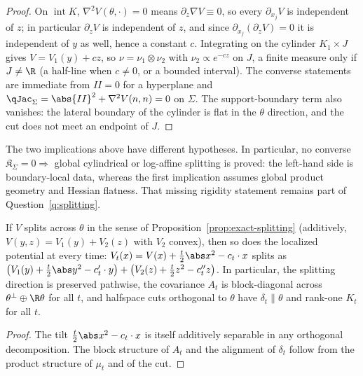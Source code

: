 \documentclass[../../main.tex]{subfiles}
\begin{document}
\begin{proof}
On $\operatorname{int}K$, $\nabla^2V(\theta,\cdot)=0$ means $\partial_z\nabla V\equiv0$, so every
$\partial_{x_j}V$ is independent of $z$; in particular $\partial_zV$ is independent of $z$, and
since $\partial_{x_j}(\partial_zV)=0$ it is independent of $y$ as well, hence a constant $c$.
Integrating on the cylinder $K_1\times J$ gives $V=V_1(y)+cz$, so $\nu=\nu_1\otimes\nu_2$ with
$\nu_2\propto e^{-cz}$ on $J$, a finite measure only if $J\ne\R$ (a half-line when $c\ne0$, or a
bounded interval). The converse statements are immediate from $II=0$ for a hyperplane and
$\qJac_\Sigma=\abs{II}^2+\nabla^2V(n,n)=0$ on $\Sigma$. The support-boundary term also vanishes:
the lateral boundary of the cylinder is flat in the $\theta$ direction, and the cut does not
meet an endpoint of $J$.
\end{proof}

The two implications above have different hypotheses. In particular, no converse
$\mathfrak K_\Sigma=0\Rightarrow$ global cylindrical or log-affine splitting is proved: the
left-hand side is boundary-local data, whereas the first implication assumes global product
geometry and Hessian flatness. That missing rigidity statement remains part of
Question~\ref{q:splitting}.

\begin{proposition}
\label{prop:persistent-splitting}
If $V$ splits across $\theta$ in the sense of
Proposition~\textup{\ref{prop:exact-splitting}} (additively, $V(y,z)=V_1(y)+V_2(z)$ with
$V_2$ convex), then so does the localized potential at every time:
$V_t(x)=V(x)+\tfrac t2\abs x^2-c_t\cdot x$ splits as
$\bigl(V_1(y)+\tfrac t2\abs y^2-c_t'\cdot y\bigr)+\bigl(V_2(z)+\tfrac t2z^2-c_t''z\bigr)$.
In particular, the splitting direction is preserved pathwise, the covariance $A_t$ is
block-diagonal across $\theta^\perp\oplus\R\theta$ for all $t$, and halfspace cuts orthogonal
to $\theta$ have $\delta_t\parallel\theta$ and rank-one $K_t$ for all $t$.
\end{proposition}

\begin{proof}
The tilt $\tfrac t2\abs x^2-c_t\cdot x$ is itself additively separable in any orthogonal
decomposition. The block structure of $A_t$ and the alignment of $\delta_t$ follow from the
product structure of $\mu_t$ and of the cut.
\end{proof}
\end{document}

